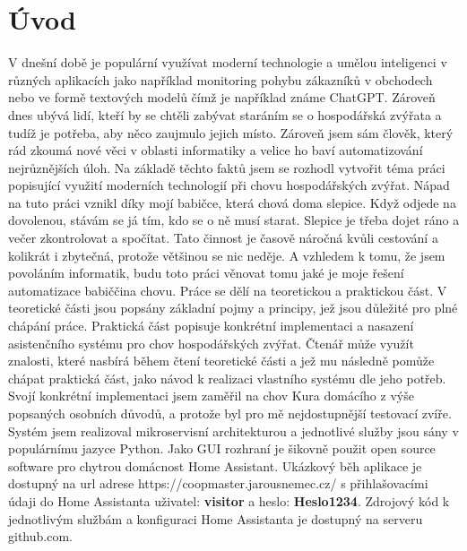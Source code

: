 \chapter{Úvod}
V dnešní době je populární využívat moderní technologie a umělou inteligenci v různých aplikacích jako například monitoring pohybu zákazníků v obchodech nebo ve formě textových modelů čímž je například známe ChatGPT. Zároveň dnes ubývá lidí, kteří by se chtěli zabývat staráním se o hospodářská zvýřata a tudíž je potřeba, aby něco zaujmulo jejich místo. Zároveň jsem sám člověk, který rád zkoumá nové věci v oblasti informatiky a velice ho baví automatizování nejrůznějších úloh. Na základě těchto faktů jsem se rozhodl vytvořit téma práci popisující využití moderních technologií při chovu hospodářských zvýřat. Nápad na tuto práci vznikl díky mojí babičce, která chová doma slepice. Když odjede na dovolenou, stávám se já tím, kdo se o ně musí starat. Slepice je třeba dojet ráno a večer zkontrolovat a spočítat. Tato činnost je časově náročná kvůli cestování a kolikrát i zbytečná, protože většinou se nic neděje. A vzhledem k tomu, že jsem povoláním informatik, budu toto práci věnovat tomu jaké je moje řešení automatizace babiččina chovu.
\newline
Práce se dělí na teoretickou a praktickou část. V teoretické části jsou popsány základní pojmy a principy, jež jsou důležité pro plné chápání práce. Praktická část popisuje konkrétní implementaci a nasazení asistenčního systému pro chov hospodářských zvýřat. Čtenář může využít znalosti, které nasbírá během čtení teoretické části a jež mu následně pomůže chápat praktická část, jako návod k realizaci vlastního systému dle jeho potřeb.
\newline
Svojí konkrétní implementaci jsem zaměřil na chov Kura domácího z výše popsaných osobních důvodů, a protože byl pro mě nejdostupnější testovací zvíře. Systém jsem realizoval mikroservisní architekturou a jednotlivé služby jsou sány v populárnímu jazyce Python. Jako GUI rozhraní je šikovně použit open source software pro chytrou domácnost Home Assistant.
\newline
Ukázkový běh aplikace je dostupný na url adrese https://coopmaster.jarousnemec.cz/ s přihlašovacími údaji do Home Assistanta uživatel: \textbf{visitor} a heslo: \textbf{Heslo1234}. Zdrojový kód k jednotlivým službám a konfiguraci Home Assistanta je dostupný na serveru github.com.
